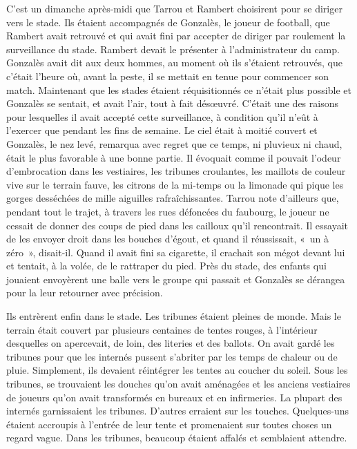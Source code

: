 \documentclass[french,twoside]{book} %
\begin{document}
C’est un dimanche après-midi que Tarrou et Rambert choisirent pour se diriger vers le stade. Ils étaient accompagnés de Gonzalès, le joueur de football, que Rambert avait retrouvé et qui avait fini par accepter de diriger par roulement la surveillance du stade. Rambert devait le présenter à l’administrateur du camp. Gonzalès avait dit aux deux hommes, au moment où ils s’étaient retrouvés, que c’était l’heure où, avant la peste, il se mettait en tenue pour commencer son match. Maintenant que les stades étaient réquisitionnés ce n’était plus possible et Gonzalès se sentait, et avait l’air, tout à fait désœuvré. C’était une des raisons pour lesquelles il avait accepté cette surveillance, à condition qu’il n’eût à l’exercer que pendant les fins de semaine. Le ciel était à moitié couvert et Gonzalès, le nez levé, remarqua avec regret que ce temps, ni pluvieux ni chaud, était le plus favorable à une bonne partie. Il évoquait comme il pouvait l’odeur d’embrocation dans les vestiaires, les tribunes croulantes, les maillots de couleur vive sur le terrain fauve, les citrons de la mi-temps ou la limonade qui pique les gorges desséchées de mille aiguilles rafraîchissantes. Tarrou note d’ailleurs que, pendant tout le trajet, à travers les rues défoncées du faubourg, le joueur ne cessait de donner des coups de pied dans les cailloux qu’il rencontrait. Il essayait de les envoyer droit dans les bouches d’égout, et quand il réussissait, « un à zéro », disait-il. Quand il avait fini sa cigarette, il crachait son mégot devant lui et tentait, à la volée, de le rattraper du pied. Près du stade, des enfants qui jouaient envoyèrent une balle vers le groupe qui passait et Gonzalès se dérangea pour la leur retourner avec précision.\par
Ils entrèrent enfin dans le stade. Les tribunes étaient pleines de monde. Mais le terrain était couvert par plusieurs centaines de tentes rouges, à l’intérieur desquelles on apercevait, de loin, des literies et des ballots. On avait gardé les tribunes pour que les internés pussent s’abriter par les temps de chaleur ou de pluie. Simplement, ils devaient réintégrer les tentes au coucher du soleil. Sous les tribunes, se trouvaient les douches qu’on avait aménagées et les anciens vestiaires de joueurs qu’on avait transformés en bureaux et en infirmeries. La plupart des internés garnissaient les tribunes. D’autres erraient sur les touches. Quelques-uns étaient accroupis à l’entrée de leur tente et promenaient sur toutes choses un regard vague. Dans les tribunes, beaucoup étaient affalés et semblaient attendre.\par
\end{document}
